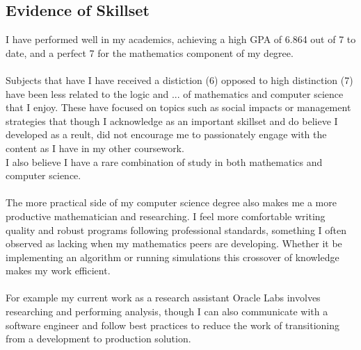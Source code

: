 \subsection*{Evidence of Skillset}
I have performed well in my academics, achieving a high GPA of 6.864 out of 7 to date, and a perfect 7 for the mathematics component of my degree.\\
\\
Subjects that have I have received a distiction (6) opposed to high distinction (7) have been less related to the logic and ... of mathematics and computer science that I enjoy. These have focused on topics such as social impacts or management strategies that though I acknowledge as an important skillset and do believe I developed as a reult, did not encourage me to passionately engage with the content as I have in my other coursework.
\\
I also believe I have a rare combination of study in both mathematics and computer science.\\
\\
The more practical side of my computer science degree also makes me a more productive mathematician and researching. I feel more comfortable writing quality and robust programs following professional standards, something I often observed as lacking when my mathematics peers are developing. Whether it be implementing an algorithm or running simulations this crossover of knowledge makes my work efficient.\\
\\
For example my current work as a research assistant Oracle Labs involves researching and performing analysis, though I can also communicate with a software engineer and follow best practices to reduce the work of transitioning from a development to production solution.\\
